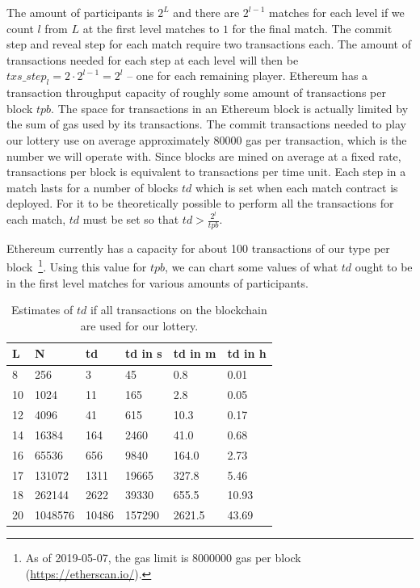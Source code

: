 The amount of participants is $2^L$ and there are $2^{l-1}$ matches for each level if we count $l$ from $L$ at the first level matches to $1$ for the final match. The commit step and reveal step for each match require two transactions each. The amount of transactions needed for each step at each level will then be $txs\_step_{l}=2 \cdot 2^{l-1}=2^l$ – one for each remaining player. Ethereum has a transaction throughput capacity of roughly some amount of transactions per block $tpb$. The space for transactions in an Ethereum block is actually limited by the sum of gas used by its transactions. The commit transactions needed to play our lottery use on average approximately 80000 gas per transaction, which is the number we will operate with. Since blocks are mined on average at a fixed rate, transactions per block is equivalent to transactions per time unit.
Each step in a match lasts for a number of blocks $td$ which is set when each match contract is deployed. For it to be theoretically possible to perform all the transactions for each match, $td$ must be set so that $td > \frac{2^{l}}{tpb}$.

Ethereum currently has a capacity for about 100 transactions of our type per block~\footnote{As of 2019-05-07, the gas limit is 8000000 gas per block (\url{https://etherscan.io/}).}. Using this value for $tpb$, we can chart some values of what $td$ ought to be in the first level matches for various amounts of participants.

\begin{table}[h]
\centering
\caption{Estimates of $td$ if all transactions on the blockchain are used for our lottery.}
\label{tab:td-100percent-transactions}
\begin{tabular}{|l|l|l|l|l|l|}
\hline

L & N & td & td in s & td in m & td in h \\ \hline
8 & 256 & 3 & 45 & 0.8 & 0.01 \\ \hline
10 & 1024 & 11 & 165 & 2.8 & 0.05 \\ \hline
12 & 4096 & 41 & 615 & 10.3 & 0.17 \\ \hline
14 & 16384 & 164 & 2460 & 41.0 & 0.68 \\ \hline
16 & 65536 & 656 & 9840 & 164.0 & 2.73 \\ \hline
17 & 131072 & 1311 & 19665 & 327.8 & 5.46 \\ \hline
18 & 262144 & 2622 & 39330 & 655.5 & 10.93 \\ \hline
20 & 1048576 & 10486 & 157290 & 2621.5 & 43.69 \\ \hline

\end{tabular}
\end{table}

